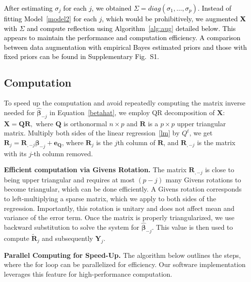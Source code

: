 \documentclass[12pt,Times]{article}
\def\tcb{\textcolor{black}}
\def\e{{\mathbf{e}}}
\def\X{{\mathbf{X}}}
\def\Y{{\mathbf{Y}}}
\def\mbeta{{\mathbf{\beta}}}
\def\Q{{\mathbf{Q}}}
\def\R{{\mathbf{R}}}
\def\tR{{\mathbf{\tilde{R}}}}
\begin{document}
\tcb{After estimating $\sigma_j$ for each $j$, we obtained $\Sigma = diag(\sigma_1, \dots, \sigma_p)$.  Instead of fitting Model~\eqref{model2} for each $j$, which would be prohibitively, we augmented $\X$ with $\Sigma$ and compute reflection using Algorithm~\ref{alg:aug} detailed below. This appears to maintain the performance and computation efficiency. A comparison between data augmentation with empirical Bayes estimated priors  and those with fixed priors can be found in Supplementary Fig.~S1.}




\subsection{Computation}
To speed up the computation and avoid repeatedly computing the matrix inverse needed for $\hat\mbeta_{-j}$ in Equation~\eqref{betahat}, we employ QR decomposition of $\X$: $\X = \Q\R,$ where $\Q$ is orthonormal $n \times p$ and $\R$ is a $p \times p$ upper triangular matrix. Multiply both sides of the linear regression~\eqref{lm} by $Q^t$, we get $\R_j = \R_{,-j} \mbeta_{-j} + \e_\Q$, where $\R_j$ is the $j$th column of $\R$, and $\R_{,-j}$ is the matrix with its $j$-th column removed. 

{\bf Efficient computation via Givens Rotation.} The matrix $\R_{,-j}$ is close to being upper triangular and requires at most $(p-j)$ many Givens rotations to become triangular, which can be done efficiently.  A Givens rotation corresponds to left-multiplying a sparse matrix, which we apply to both sides of the regression. Importantly, this rotation is unitary and does not affect mean and variance of the error term.
%
Once the matrix is properly triangularized, we use backward substitution to solve the system for $\hat\mbeta_{-j}.$ This value is then used to compute $\tR_j$ and subsequently $\Y_j$. 


{\bf Parallel Computing for Speed-Up.} The algorithm below outlines the steps, where the for loop can be parallelized for efficiency. Our software  implementation leverages this feature for high-performance computation.

\end{document}
